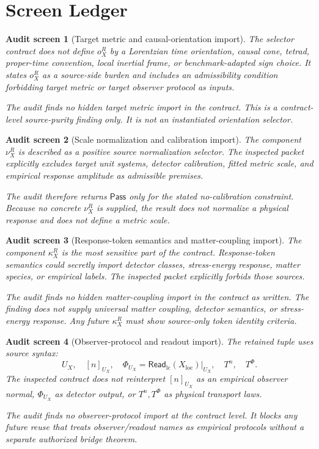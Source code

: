 \documentclass[11pt]{article}
\newcommand{\ReadLC}{\mathsf{Read}_{\mathrm{lc}}}
\newcommand{\Pass}{\mathsf{Pass}}
\newtheorem{screen}{Audit screen}
\begin{document}
\section{Screen Ledger}

\begin{screen}[Target metric and causal-orientation import]
The selector contract does not define \(o^R_X\) by a Lorentzian time
orientation, causal cone, tetrad, proper-time convention, local
inertial frame, or benchmark-adapted sign choice. It states \(o^R_X\)
as a source-side burden and includes an admissibility condition
forbidding target metric or target observer protocol as inputs.

The audit finds no hidden target metric import in the contract. This
is a contract-level source-purity finding only. It is not an
instantiated orientation selector.
\end{screen}

\begin{screen}[Scale normalization and calibration import]
The component \(\nu^R_X\) is described as a positive source
normalization selector. The inspected packet explicitly excludes
target unit systems, detector calibration, fitted metric scale, and
empirical response amplitude as admissible premises.

The audit therefore returns \(\Pass\) only for the stated no-calibration
constraint. Because no concrete \(\nu^R_X\) is supplied, the result
does not normalize a physical response and does not define a metric
scale.
\end{screen}

\begin{screen}[Response-token semantics and matter-coupling import]
The component \(\kappa^R_X\) is the most sensitive part of the
contract. Response-token semantics could secretly import detector
classes, stress-energy response, matter species, or empirical labels.
The inspected packet explicitly forbids those sources.

The audit finds no hidden matter-coupling import in the contract as
written. The finding does not supply universal matter coupling,
detector semantics, or stress-energy response. Any future
\(\kappa^R_X\) must show source-only token identity criteria.
\end{screen}

\begin{screen}[Observer-protocol and readout import]
The retained tuple uses source syntax:
\[
    U_X,\quad [n]_{U_X},\quad
    \Phi_{U_X}=\ReadLC(X_{\mathrm{loc}})|_{U_X},\quad
    T^n,\quad T^\Phi.
\]
The inspected contract does not reinterpret \([n]_{U_X}\) as an
empirical observer normal, \(\Phi_{U_X}\) as detector output, or
\(T^n,T^\Phi\) as physical transport laws.

The audit finds no observer-protocol import at the contract level. It
blocks any future reuse that treats observer/readout names as
empirical protocols without a separate authorized bridge theorem.
\end{screen}
\end{document}
